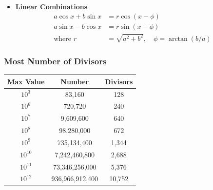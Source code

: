 \begin{itemize}
    \item \textbf{Linear Combinations}
          \begin{align*}
              a \cos x + b \sin x & = r \cos(x - \phi)                            \\
              a \sin x - b \cos x & = r \sin(x - \phi)                            \\
              \text{where } r     & = \sqrt{a^2 + b^2}, \quad \phi = \arctan(b/a)
          \end{align*}
\end{itemize}

\subsubsection{Most Number of Divisors}
\vspace{2.5mm}
\noindent
\begin{tabular}{|c|c|c|}
    \hline
    \textbf{Max Value} & \textbf{Number} & \textbf{Divisors} \\
    \hline
    $10^3$             & 83,160          & 128               \\
    \hline
    $10^6$             & 720,720         & 240               \\
    \hline
    $10^7$             & 9,609,600       & 640               \\
    \hline
    $10^8$             & 98,280,000      & 672               \\
    \hline
    $10^9$             & 735,134,400     & 1,344             \\
    \hline
    $10^{10}$          & 7,242,460,800   & 2,688             \\
    \hline
    $10^{11}$          & 73,346,256,000  & 5,376             \\
    \hline
    $10^{12}$          & 936,966,912,400 & 10,752            \\
    \hline
\end{tabular}

